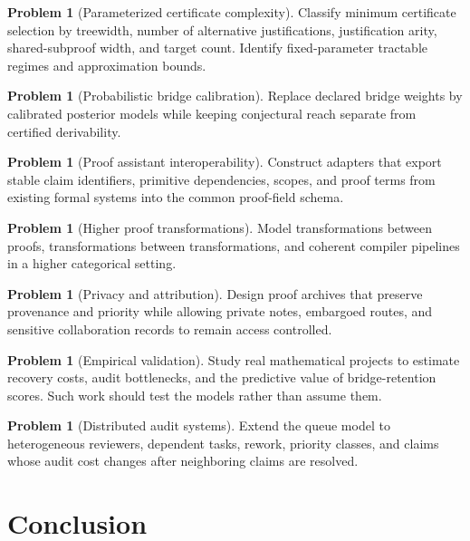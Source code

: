 \documentclass[11pt,oneside]{article}
\theoremstyle{definition}
\newtheorem{problem}[theorem]{Problem}
\theoremstyle{remark}
\begin{document}
\begin{problem}[Parameterized certificate complexity]
Classify minimum certificate selection by treewidth, number of alternative justifications, justification arity, shared-subproof width, and target count. Identify fixed-parameter tractable regimes and approximation bounds.
\end{problem}

\begin{problem}[Probabilistic bridge calibration]
Replace declared bridge weights by calibrated posterior models while keeping conjectural reach separate from certified derivability.
\end{problem}

\begin{problem}[Proof assistant interoperability]
Construct adapters that export stable claim identifiers, primitive dependencies, scopes, and proof terms from existing formal systems into the common proof-field schema.
\end{problem}

\begin{problem}[Higher proof transformations]
Model transformations between proofs, transformations between transformations, and coherent compiler pipelines in a higher categorical setting.
\end{problem}

\begin{problem}[Privacy and attribution]
Design proof archives that preserve provenance and priority while allowing private notes, embargoed routes, and sensitive collaboration records to remain access controlled.
\end{problem}

\begin{problem}[Empirical validation]
Study real mathematical projects to estimate recovery costs, audit bottlenecks, and the predictive value of bridge-retention scores. Such work should test the models rather than assume them.
\end{problem}

\begin{problem}[Distributed audit systems]
Extend the queue model to heterogeneous reviewers, dependent tasks, rework, priority classes, and claims whose audit cost changes after neighboring claims are resolved.
\end{problem}

\section{Conclusion}
\end{document}
